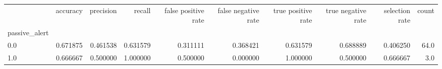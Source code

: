\begin{tabular}{lrrrrrrrrr}
\toprule
{} &  accuracy &  precision &    recall &  false positive rate &  false negative rate &  true positive rate &  true negative rate &  selection rate &  count \\
passive\_alert &           &            &           &                      &                      &                     &                     &                 &        \\
\midrule
0.0           &  0.671875 &   0.461538 &  0.631579 &             0.311111 &             0.368421 &            0.631579 &            0.688889 &        0.406250 &   64.0 \\
1.0           &  0.666667 &   0.500000 &  1.000000 &             0.500000 &             0.000000 &            1.000000 &            0.500000 &        0.666667 &    3.0 \\
\bottomrule
\end{tabular}
